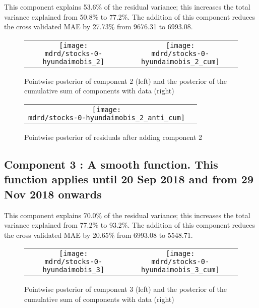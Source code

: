 \documentclass{article} %
\begin{document}


This component explains 53.6\% of the residual variance; this increases the total variance explained from 50.8\% to 77.2\%.
The addition of this component reduces the cross validated MAE by 27.73\% from 9676.31 to 6993.08.


\begin{figure}[H]
\newcommand{\wmgd}{0.5\columnwidth}
\newcommand{\hmgd}{3.0cm}
\newcommand{\mdrd}{stocks-0-hyundaimobis}
\newcommand{\mbm}{\hspace{-0.3cm}}
\begin{tabular}{cc}
\mbm \texttt{[image: \\mdrd/stocks-0-hyundaimobis\_2]} & \texttt{[image: \\mdrd/stocks-0-hyundaimobis\_2\_cum]}
\end{tabular}
\caption{Pointwise posterior of component 2 (left) and the posterior of the cumulative sum of components with data (right)}
\label{fig:comp2}
\end{figure}

\begin{figure}[H]
\newcommand{\wmgd}{0.5\columnwidth}
\newcommand{\hmgd}{3.0cm}
\newcommand{\mdrd}{stocks-0-hyundaimobis}
\newcommand{\mbm}{\hspace{-0.3cm}}
\begin{tabular}{cc}
\mbm \texttt{[image: \\mdrd/stocks-0-hyundaimobis\_2\_anti\_cum]}
\end{tabular}
\caption{Pointwise posterior of residuals after adding component 2}
\label{fig:comp2}
\end{figure}

\subsection{Component 3 : A smooth function. This function applies until 20 Sep 2018 and from 29 Nov 2018 onwards}



This component explains 70.0\% of the residual variance; this increases the total variance explained from 77.2\% to 93.2\%.
The addition of this component reduces the cross validated MAE by 20.65\% from 6993.08 to 5548.71.


\begin{figure}[H]
\newcommand{\wmgd}{0.5\columnwidth}
\newcommand{\hmgd}{3.0cm}
\newcommand{\mdrd}{stocks-0-hyundaimobis}
\newcommand{\mbm}{\hspace{-0.3cm}}
\begin{tabular}{cc}
\mbm \texttt{[image: \\mdrd/stocks-0-hyundaimobis\_3]} & \texttt{[image: \\mdrd/stocks-0-hyundaimobis\_3\_cum]}
\end{tabular}
\caption{Pointwise posterior of component 3 (left) and the posterior of the cumulative sum of components with data (right)}
\label{fig:comp3}
\end{figure}
\end{document}
